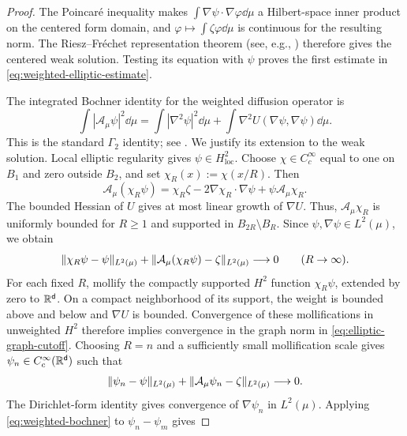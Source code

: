 \documentclass[11pt,reqno]{amsart}
\numberwithin{equation}{section}
\theoremstyle{plain}
\theoremstyle{remark}
\DeclarePairedDelimiter{\norm}{\lVert}{\rVert}
\renewcommand{\d}{\mathsf{d}}\newcommand{\s}{\mathsf{s}}
\newcommand{\Aop}{\mathcal A}
\begin{document}
\begin{proof}
The Poincar\'e inequality makes $\int\nabla\psi\cdot\nabla\varphi\dd\mu$ a Hilbert-space inner product on the centered form domain, and $\varphi\mapsto\int\zeta\varphi\dd\mu$ is continuous for the resulting norm. The Riesz--Fr\'echet representation theorem (see, e.g., \cite[Theorem~5.5]{Brezis}) therefore gives the centered weak solution. Testing its equation with $\psi$ proves the first estimate in \eqref{eq:weighted-elliptic-estimate}.

The integrated Bochner identity for the weighted diffusion operator is
\begin{equation}\label{eq:weighted-bochner}
 \int|\Aop_\mu\psi|^2\dd\mu
 =\int|\nabla^2\psi|^2\dd\mu+
   \int\nabla^2U(\nabla\psi,\nabla\psi)\dd\mu.
\end{equation}
This is the standard $\Gamma_2$ identity; see \cite[Chapters~1 and~4]{BGL}. We justify its extension to the weak solution. Local elliptic regularity gives $\psi\in H^2_{\mathrm{loc}}$. Choose $\chi\in C_c^\infty$ equal to one on $B_1$ and zero outside $B_2$, and set $\chi_R(x):=\chi(x/R)$. Then
\begin{equation}\label{eq:elliptic-cutoff-identity}
 \Aop_\mu(\chi_R\psi)
 =\chi_R\zeta-2\nabla\chi_R\cdot\nabla\psi
   +\psi\Aop_\mu\chi_R.
\end{equation}
The bounded Hessian of $U$ gives at most linear growth of $\nabla U$. Thus, $\Aop_\mu\chi_R$ is uniformly bounded for $R\ge1$ and supported in $B_{2R}\setminus B_R$. Since $\psi,\nabla\psi\in L^2(\mu)$, we obtain
\begin{equation}\label{eq:elliptic-graph-cutoff}
 \norm{\chi_R\psi-\psi}_{L^2(\mu)}
 +\norm{\Aop_\mu(\chi_R\psi)-\zeta}_{L^2(\mu)}
 \longrightarrow0\qquad(R\to\infty).
\end{equation}
For each fixed $R$, mollify the compactly supported $H^2$ function $\chi_R\psi$, extended by zero to $\R^\d$. On a compact neighborhood of its support, the weight is bounded above and below and $\nabla U$ is bounded. Convergence of these mollifications in unweighted $H^2$ therefore implies convergence in the graph norm in \eqref{eq:elliptic-graph-cutoff}. Choosing $R=n$ and a sufficiently small mollification scale gives $\psi_n\in C_c^\infty(\R^\d)$ such that
\begin{equation}\label{eq:elliptic-graph-mollification}
 \norm{\psi_n-\psi}_{L^2(\mu)}
 +\norm{\Aop_\mu\psi_n-\zeta}_{L^2(\mu)}\longrightarrow0.
\end{equation}
The Dirichlet-form identity gives convergence of $\nabla\psi_n$ in $L^2(\mu)$. Applying \eqref{eq:weighted-bochner} to $\psi_n-\psi_m$ gives

\end{proof}
\end{document}
